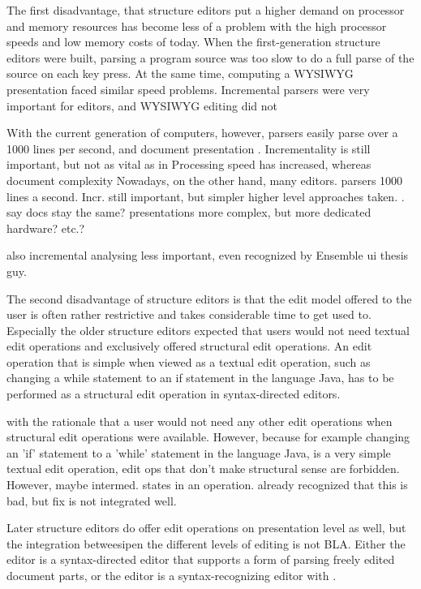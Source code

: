 The first disadvantage, that structure editors put a higher demand on processor and memory resources has become less of a problem with the high processor speeds and low memory costs of today. When the first-generation structure editors were built, parsing a program source was too slow to do a full parse of the source on each key press. At the same time, computing a WYSIWYG presentation faced similar speed problems. Incremental parsers were very important for editors, and WYSIWYG editing did not 

With the current generation of computers, however, parsers easily parse over a 1000 lines per second, and document presentation . Incrementality is still important, but not as vital as in %
Processing speed has increased, whereas document complexity Nowadays, on the other hand, many editors. parsers 1000 lines a second. Incr. still important, but simpler higher level approaches taken. 
. say docs stay the same? presentations more complex, but more dedicated hardware? etc.?

also incremental analysing less important, even recognized by Ensemble ui thesis guy.


The second disadvantage of structure editors is that the edit model offered to the user is often rather restrictive and takes considerable time to get used to. Especially the older structure editors expected that users would not need textual edit operations and exclusively offered structural edit operations. An edit operation that is simple when viewed as a textual edit operation, such as changing a while statement to an if statement in the language Java, has to be performed as a structural edit operation in syntax-directed editors. 

 with the rationale that a user would not need any other edit operations when structural edit operations were available. However, because for example changing an 'if' statement to a 'while' statement in the language Java, is a very simple textual edit operation, 
edit ops that don't make structural sense are forbidden. However, maybe intermed. states in an operation. 
already recognized that this is bad, but fix is not integrated well.

Later structure editors do offer edit operations on presentation level as well, but the integration betweesipen the different levels of editing is not BLA. Either the editor is a syntax-directed editor that supports a form of parsing freely edited document parts, or the editor is a syntax-recognizing editor with .  


